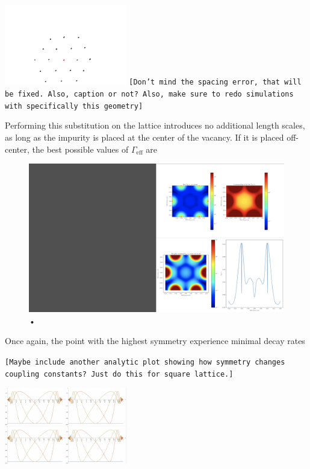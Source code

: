 \documentclass[aps,pra,superscriptaddress,twocolumn]{revtex4-1}
\newcommand{\commentSB}[1]{\texttt{\color{blue}[#1]}}
\begin{document}
\includegraphics[width=0.4\textwidth]{figures/triangle_substitution_geometry.png}
\commentSB{Don't mind the spacing error, that will be fixed. Also, caption or not? Also, make sure to redo simulations with specifically this geometry}

Performing this substitution on the lattice introduces no additional length scales, as long as the impurity is placed at the center of the vacancy. If it is placed off-center, the best possible values of $\Gamma_\text{eff}$ are 


\begin{figure}
    \centering
    \includegraphics[width=1.0\textwidth]{figures/triangle_and_square_plaquette_substitution.png} 
    \caption{•}
    \label{fig:triangle_and_square_plaquette_substitution}
\end{figure}

Once again, the point with the highest symmetry experience minimal decay rates


\commentSB{Maybe include another analytic plot showing how symmetry changes coupling constants? Just do this for square lattice.}

\includegraphics[width=0.4\textwidth]{figures/triangle_and_square_substitution_coupling.png}
\end{document}
